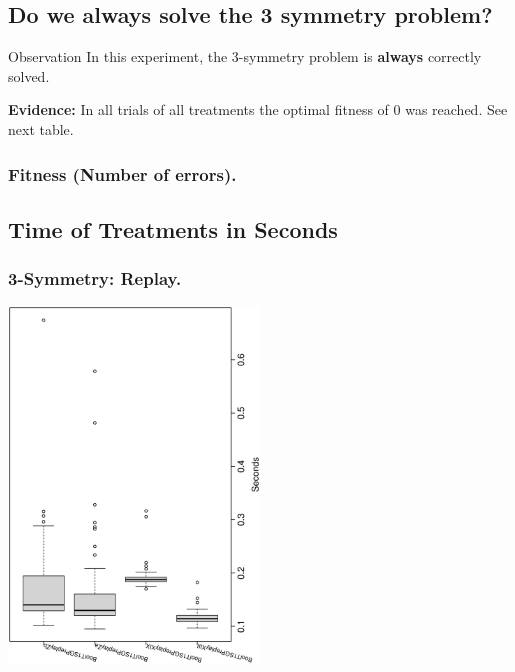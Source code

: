 \documentclass[18pt,c]{beamer}
\begin{document}
\subsection{Do we {\bf always} solve the 3 symmetry problem?}
\begin{frame}
\vspace*{2mm}
\begin{block}{
Observation
}
In this experiment, the 3-symmetry problem is {\bf always} correctly solved.
 
{\bf Evidence:}
In all trials of all treatments the optimal fitness of $0$ was reached.
See next table.
\end{block}
\end{frame}%
 \begin{frame}
 \fontsize{8pt}{9pt}\selectfont
 \frametitle{ Fitness (Number of errors). }

 \label{ExpCStatsTable000.tex}  
 \end{frame}

\subsection{Time of Treatments in Seconds}
 \begin{frame}
 \frametitle{ 3-Symmetry: Replay.  }
 \begin{center}
\includegraphics[width=0.5\textwidth, angle=-90]
{ExpCboxplottSeconds000.eps}
 \end{center}
 \label{ExpCboxplottSeconds000.eps}  
 \end{frame}
\end{document}
